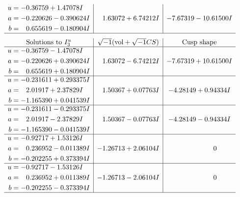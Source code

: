 \documentclass[1p]{elsarticle_modified}
\theoremstyle{definition}
\newcommand{\I}{\sqrt{-1}}
\begin{document}
$$\begin{array}{c|c|c}
\begin{aligned}
u &= -0.36759 + 1.47078 I \\
a &= -0.220626 - 0.390624 I \\
b &= \phantom{-}0.655619 - 0.180904 I\end{aligned}
 & \phantom{-}1.63072 + 6.74212 I & -7.67319 - 10.61500 I\\
 \hline 
 \end{array}$$\newpage$$\begin{array}{c|c|c}  
\text{Solutions to }I^u_{3}& \I (\text{vol} + \sqrt{-1}CS) & \text{Cusp shape}\\
 \hline 
\begin{aligned}
u &= -0.36759 - 1.47078 I \\
a &= -0.220626 + 0.390624 I \\
b &= \phantom{-}0.655619 + 0.180904 I\end{aligned}
 & \phantom{-}1.63072 - 6.74212 I & -7.67319 + 10.61500 I \\ \hline\begin{aligned}
u &= -0.231611 + 0.293375 I \\
a &= \phantom{-}2.01917 + 2.37829 I \\
b &= -1.165390 + 0.041539 I\end{aligned}
 & \phantom{-}1.50367 + 0.07763 I & -4.28149 + 0.94334 I \\ \hline\begin{aligned}
u &= -0.231611 - 0.293375 I \\
a &= \phantom{-}2.01917 - 2.37829 I \\
b &= -1.165390 - 0.041539 I\end{aligned}
 & \phantom{-}1.50367 - 0.07763 I & -4.28149 - 0.94334 I \\ \hline\begin{aligned}
u &= -0.92717 + 1.53126 I \\
a &= \phantom{-}0.236952 - 0.011389 I \\
b &= -0.202255 + 0.373394 I\end{aligned}
 & -1.26713 + 2.06104 I & \phantom{-0.000000 } 0 \\ \hline\begin{aligned}
u &= -0.92717 - 1.53126 I \\
a &= \phantom{-}0.236952 + 0.011389 I \\
b &= -0.202255 - 0.373394 I\end{aligned}
 & -1.26713 - 2.06104 I & \phantom{-0.000000 } 0\\
 \hline 
 \end{array}$$\newpage
\end{document}
